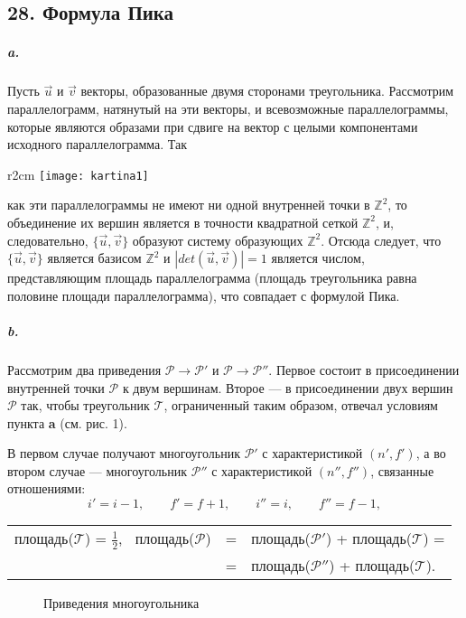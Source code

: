 {\subsection{\normalsize{28. Формула Пика}}

\subparagraph{a.} Пусть $\vec{u}$ и $\vec{v}$ векторы, образованные двумя сторонами треугольника. Рассмотрим параллелограмм, натянутый на эти векторы, и всевозможные параллелограммы, которые являются образами при сдвиге
на вектор с целыми компонентами исходного параллелограмма. Так
\begin{wrapfigure}{r}{2cm}
\texttt{[image: kartina1]}
\end{wrapfigure}
как эти параллелограммы не имеют ни одной 
внутренней точки в $\mathbb {Z}^{2}$, то объединение их вершин 
является в точности квадратной сеткой $\mathbb {Z}^{2}$, и, 
следовательно, $\{\vec{u},\vec{v}\}$ образуют систему образующих $\mathbb {Z}^{2}$. 
Отсюда следует, что $\{\vec{u},\vec{v}\}$ является базисом $\mathbb {Z}^{2}$ и $|det(\vec{u},\vec{v})| = 1$ является числом, представляющим площадь параллелограмма (площадь треугольника равна половине площади параллелограмма), что совпадает с формулой Пика.

\subparagraph{b.} Рассмотрим два приведения $\mathcal{P} \rightarrow \mathcal{P}'$ и $\mathcal{P} \rightarrow \mathcal{P}''$. Первое состоит в присоединении внутренней точки $\mathcal{P}$ к двум вершинам. Второе --- в присоединении двух вершин $\mathcal{P}$ так, чтобы треугольник $\mathcal{T}$, ограниченный таким образом, отвечал условиям пункта {\bf a} (см. рис. 1).

В первом случае получают многоугольник $\mathcal{P}'$ с характеристикой $(n',f')$, а во втором случае — многоугольник $\mathcal{P}''$ с характеристикой $(n'',f'')$, связанные отношениями:
\begin{equation*}
i' = i - 1,\qquad f' = f + 1,\qquad i'' = i,\qquad f'' = f - 1,
\end{equation*}

\begin{tabular}{ccl} 
площадь($\mathcal{T}$) = $\frac{1}{2}$,$\;\;$ площадь($\mathcal{P}$) &=& площадь($\mathcal{P}'$) + площадь($\mathcal{T}$) = \\
                                                       &=& площадь($\mathcal{P}''$) + площадь($\mathcal{T}$).
\end{tabular} 

\begin{figure}[h]
\caption{Приведения многоугольника}
\end{figure}



}
